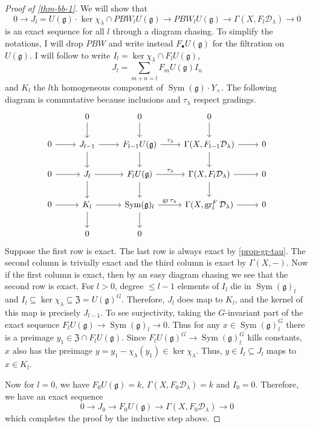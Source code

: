 \documentclass[11pt, a4paper]{article}
\theoremstyle{definition}
\newcommand{\gr}{\operatorname{gr}}
\newcommand{\Sym}[0]{\operatorname{Sym}}
\newcommand{\g}{\mathfrak g}
\begin{document}
    \begin{proof}[Proof of \cref{thm-bb-1}]
        We will show that
        \[0\to J_l=U(\g)\cdot\ker\chi_\lambda\cap \mathit{PBW}_lU(\g)\to \mathit{PBW}_lU(\g)\to\Gamma(X, F_l\mathcal D_\lambda)\to 0\]
        is an exact sequence for all $l$ through a diagram chasing. To simplify the notations, I will drop $\mathit{PBW}$ and write instead $F_\bullet U(\g)$ for the filtration on $U(\g)$. I will follow \cite{htt-d-modules} to write $I_l=\ker\chi_\lambda\cap F_lU(\g)$, 
        \[J_l=\sum_{m+n=l}F_mU(\g)I_n\]
        and $K_l$ the $l$th homogeneous component of $\Sym(\g)\cdot Y_+$. The following diagram is commutative because inclusions and $\tau_\lambda$ respect gradings.
        \[
            \begin{tikzcd}
                & 0 \arrow[d]                 & 0 \arrow[d]                                       & 0 \arrow[d]                                                &   \\
            0 \arrow[r] & J_{l-1} \arrow[d] \arrow[r] & F_{l-1}U(\g) \arrow[d] \arrow[r, "\tau_\lambda"]  & {\Gamma(X, F_{l-1}\mathcal D_\lambda)} \arrow[d] \arrow[r] & 0 \\
            0 \arrow[r] & J_l \arrow[d] \arrow[r]     & F_lU(\g) \arrow[d] \arrow[r, "\tau_\lambda"]      & {\Gamma(X, F_{l}\mathcal D_\lambda)} \arrow[d] \arrow[r]   & 0 \\
            0 \arrow[r] & K_l \arrow[d] \arrow[r]     & \Sym(\g)_l \arrow[d] \arrow[r, "\gr\tau_\lambda"] & {\Gamma(X, \gr_l^F\mathcal D_\lambda)} \arrow[r]           & 0 \\
                        & 0                           & 0                                                 &                                                            &  
            \end{tikzcd}   
        \]
        Suppose the first row is exact. The last row is always exact by \cref{prop-gr-tau}. The second column is trivially exact and the third column is exact by $\Gamma(X, -)$. Now if the first column is exact, then by an easy diagram chasing we see that the second row is exact. For $l>0$, degree $\leqslant l-1$ elements of $I_l$ die in $\Sym(\g)_l$ and $I_l\subseteq \ker\chi_\lambda\subseteq \mathfrak Z=U(\g)^G$. Therefore, $J_l$ does map to $K_l$, and the kernel of this map is precisely $J_{l-1}$. To see surjectivity, taking the $G$-invariant part of the exact sequence $F_lU(\g)\to\Sym(\g)_l\to 0$. Thus for any $x\in\Sym(\g)_l^G$ there is a preimage $y_1\in\mathfrak Z\cap F_lU(\g)$. Since $F_lU(\g)^G\to \Sym(\g)_l^G$ kills constants, $x$ also has the preimage $y=y_1-\chi_\lambda(y_1)\in\ker\chi_\lambda$. Thus, $y\in I_l\subseteq J_l$ maps to $x\in K_l$.

        Now for $l=0$, we have $F_0U(\g)=k$, $\Gamma(X, F_0\mathcal D_\lambda)=k$ and $I_0=0$. Therefore, we have an exact sequence
        \[0\to J_0\to F_0U(\g)\to \Gamma(X, F_0\mathcal D_\lambda)\to 0\]
        which completes the proof by the inductive step above.
    \end{proof}
\end{document}
